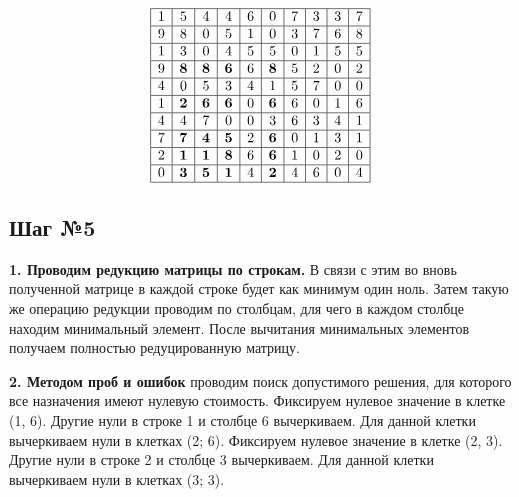 \documentclass[17pt]{extarticle}
\begin{document}
\[
    \begin{array}{|*{10}{c|}}
        \hline
        1 & 5          & 4          & 4          & 6 & 0          & 7 & 3 & 3 & 7 \\
        \hline
        9 & 8          & 0          & 5          & 1 & 0          & 3 & 7 & 6 & 8 \\
        \hline
        1 & 3          & 0          & 4          & 5 & 5          & 0 & 1 & 5 & 5 \\
        \hline
        9 & \textbf{8} & \textbf{8} & \textbf{6} & 6 & \textbf{8} & 5 & 2 & 0 & 2 \\
        \hline
        4 & 0          & 5          & 3          & 4 & 1          & 5 & 7 & 0 & 0 \\
        \hline
        1 & \textbf{2} & \textbf{6} & \textbf{6} & 0 & \textbf{6} & 6 & 0 & 1 & 6 \\
        \hline
        4 & 4          & 7          & 0          & 0 & 3          & 6 & 3 & 4 & 1 \\
        \hline
        7 & \textbf{7} & \textbf{4} & \textbf{5} & 2 & \textbf{6} & 0 & 1 & 3 & 1 \\
        \hline
        2 & \textbf{1} & \textbf{1} & \textbf{8} & 6 & \textbf{6} & 1 & 0 & 2 & 0 \\
        \hline
        0 & \textbf{3} & \textbf{5} & \textbf{1} & 4 & \textbf{2} & 4 & 6 & 0 & 4 \\
        \hline
    \end{array}
\]

\subsection*{Шаг №5}

\textbf{1. Проводим редукцию матрицы по строкам.} В связи с этим во вновь полученной матрице в каждой строке будет как минимум один ноль.
Затем такую же операцию редукции проводим по столбцам, для чего в каждом столбце находим минимальный элемент.
После вычитания минимальных элементов получаем полностью редуцированную матрицу.

\textbf{2. Методом проб и ошибок} проводим поиск допустимого решения, для которого все назначения имеют нулевую стоимость.
Фиксируем нулевое значение в клетке (1, 6). Другие нули в строке 1 и столбце 6 вычеркиваем. Для данной клетки вычеркиваем нули в клетках (2; 6).
Фиксируем нулевое значение в клетке (2, 3). Другие нули в строке 2 и столбце 3 вычеркиваем. Для данной клетки вычеркиваем нули в клетках (3; 3).
\end{document}
